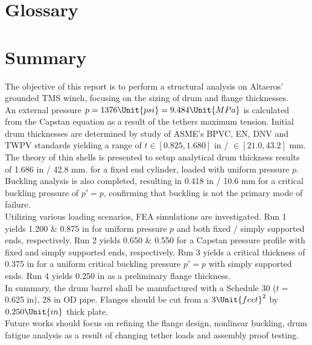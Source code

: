 %
%
\chapter{Glossary}

\nomenclatureitem[]{}{}




\chapter{Summary}

The objective of this report is to perform a structural analysis on Altaeros' grounded TMS winch, focusing on the sizing of drum and flange thicknesses.\\

An external pressure $p=1376\Unit{psi}= 9.484\Unit{MPa}$ is calculated from the Capstan equation as a result of the tethers maximum tension. Initial drum thicknesses are determined by study of ASME's BPVC, EN, DNV and TWPV standards yielding a range of $t\in [0.825, 1.680]$ in / $\in [21.0, 43.2]$ mm.\\

The theory of thin shells is presented to setup analytical drum thickness results of 1.686 in / 42.8 mm. for a fixed end cylinder, loaded with uniform pressure $p$. Buckling analysis is also completed, resulting in 0.418 in / 10.6 mm for a critical buckling pressure of $p'=p$, confirming that buckling is not the primary mode of failure.\\

Utilizing various loading scenarios, FEA simulations are investigated. Run 1 yields 1.200 \& 0.875 in for uniform pressure $p$ and both fixed / simply supported ends, respectively. Run 2 yields 0.650 \& 0.550 for a Capstan pressure profile with fixed and simply supported ends, respectively. Run 3 yields a critical thickness of 0.375 in for a uniform critical buckling pressure $p'=p$ with simply supported ends. Run 4 yields 0.250 in as a preliminary flange thickness.\\

In summary, the drum barrel shall be manufactured with a Schedule 30 ($t=$ 0.625 in), 28 in OD pipe. Flanges should be cut from a $3\Unit{feet}^2$ by $0.250\Unit{in}$ thick plate.\\

Future works should focus on refining the flange design, nonlinear buckling, drum fatigue analysis as a result of changing tether loads and assembly proof testing.